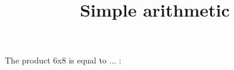 \documentclass{article}
\begin{document}
\begin{category}
\begin{question}[multichoice]
\title{Simple arithmetic}
The product 6x8 is equal to ... :



\end{question}

\end{category}
\end{document}
